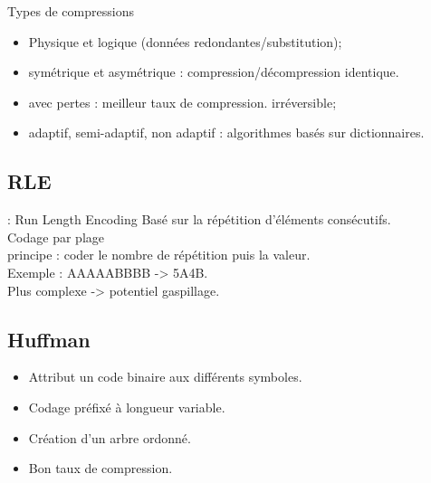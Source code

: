\documentclass[14pt]{beamer}
\begin{document}
\begin{frame}{Types de compressions}
    \begin{itemize}
    \item Physique et logique (données redondantes/substitution);
    \item symétrique et asymétrique : compression/décompression identique.
    \item avec pertes : meilleur taux de compression. irréversible;
    \item adaptif, semi-adaptif, non adaptif : algorithmes basés sur dictionnaires.
    \end{itemize}

\end{frame}


\subsection{RLE}
\begin{frame}{\subsecname : Run Length Encoding}
Basé sur la répétition d'éléments consécutifs. \\
Codage par plage\\
principe : coder le nombre de répétition puis la valeur.\\
\vfill
Exemple : AAAAABBBB -> 5A4B.\\
\vfill
Plus complexe -> potentiel gaspillage.
\end{frame}



\subsection{Huffman}
\begin{frame}{\subsecname}
\begin{itemize}
\item Attribut un code binaire aux différents symboles.\\
\item Codage préfixé à longueur variable.\\
\item Création d'un arbre ordonné.
\item Bon taux de compression.
\end{itemize}
\vfill
\end{frame}
\end{document}
